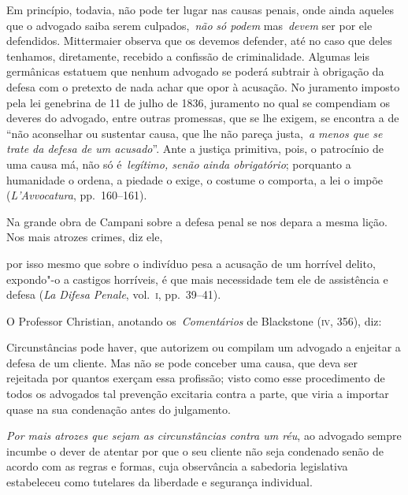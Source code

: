 \begin{hedraquote}
Em princípio, todavia, não pode ter lugar nas causas penais,
onde ainda aqueles que o advogado saiba serem culpados, \textit{não}
\textit{só podem} mas \textit{devem} ser por ele defendidos.
Mittermaier observa que os devemos defender, até no caso que deles
tenhamos, diretamente, recebido a confissão de criminalidade. Algumas
leis germânicas estatuem que nenhum advogado se poderá subtrair à
obrigação da defesa com o pretexto de nada achar que opor à acusação.
No juramento imposto pela lei genebrina de 11 de julho de 1836,
juramento no qual se compendiam os deveres do advogado, entre outras
promessas, que se lhe exigem, se encontra a de “não aconselhar ou
sustentar causa, que lhe não pareça justa, \textit{a menos que se trate
da defesa de um acusado}”. Ante a justiça primitiva, pois, o patrocínio
de uma causa má, não só é \textit{legítimo, senão ainda obrigatório};
porquanto a humanidade o ordena, a piedade o exige, o costume o
comporta, a lei o impõe (\textit{L’Avvocatura}, pp.~160--161). 
\end{hedraquote}

Na grande obra de Campani sobre a defesa penal se nos depara a mesma lição. 
Nos mais atrozes crimes, diz ele, 

\begin{hedraquote}
por isso mesmo que sobre o indivíduo pesa
a acusação de um horrível delito, expondo"-o a castigos horríveis, é que
mais necessidade tem ele de assistência e defesa (\textit{La Difesa
Penale}, vol.~\textsc{i}, pp.~39--41). 
\end{hedraquote}

O Professor Christian, anotando
os \textit{Comentários} de Blackstone (\textsc{iv}, 356), diz: 

\begin{hedraquote}
Circunstâncias pode haver, que autorizem ou compilam um advogado 
a enjeitar a defesa de um cliente. Mas não se pode conceber uma causa, 
que deva ser rejeitada por quantos exerçam essa profissão; visto como esse
procedimento de todos os advogados tal prevenção excitaria contra a
parte, que viria a importar quase na sua condenação antes do julgamento. 

\textit{Por mais atrozes que sejam as circunstâncias contra
um réu}, ao advogado sempre incumbe o dever de atentar por que o seu
cliente não seja condenado senão de acordo com as regras e formas, cuja
observância a sabedoria legislativa estabeleceu como tutelares da
liberdade e segurança individual. 
\end{hedraquote}

